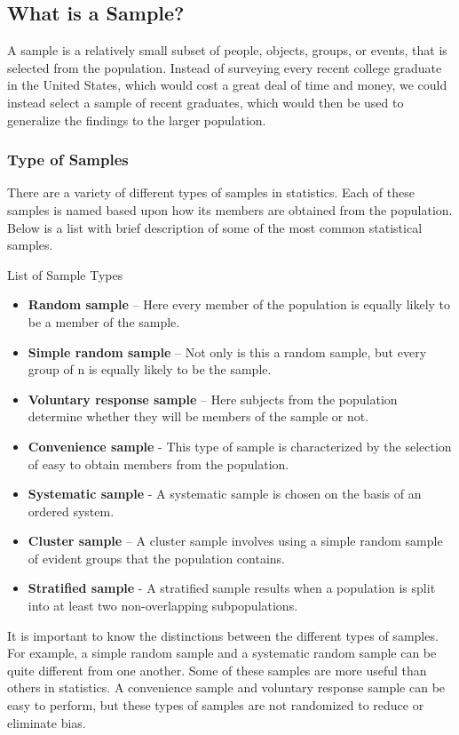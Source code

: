 
\subsection*{What is a Sample?}
A sample is a relatively small subset of people, objects, groups, or events, that is selected from the population. Instead of surveying every recent college graduate in the United States, which would cost a great deal of time and money, we could instead select a sample of recent graduates, which would then be used to generalize the findings to the larger population.

\subsubsection{Type of Samples}
There are a variety of different types of samples in statistics. Each of these samples is named based upon how its members are obtained from the population. Below is a list with brief description of some of the most common statistical samples.

List of Sample Types

\begin{itemize}
\item \textbf{Random sample} – Here every member of the population is equally likely to be a member of the sample.
\item \textbf{Simple random sample} – Not only is this a random sample, but every group of n is equally likely to be the sample.
\item \textbf{Voluntary response sample} – Here subjects from the population determine whether they will be members of the sample or not.
\item \textbf{Convenience sample} - This type of sample is characterized by the selection of easy to obtain members from the population.
\item \textbf{Systematic sample} - A systematic sample is chosen on the basis of an ordered system.
\item \textbf{Cluster sample} – A cluster sample involves using a simple random sample of evident groups that the population contains.
\item \textbf{Stratified sample} - A stratified sample results when a population is split into at least two non-overlapping subpopulations.
\end{itemize}
It is important to know the distinctions between the different types of samples. For example, a simple random sample and a systematic random sample can be quite different from one another. Some of these samples are more useful than others in statistics. A convenience sample and voluntary response sample can be easy to perform, but these types of samples are not randomized to reduce or eliminate bias.


